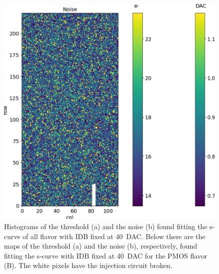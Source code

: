 \begin{figure}[h!]
            \includegraphics[width=.49\linewidth]{figures/charaterization/noise_map.pdf}            
            \caption{Histograms of the threshold (a) and the noise (b) found fitting the s-curve of all flavor with IDB fixed at \SI{40}{DAC}. Below there are the maps of the threshold (a) and the noise (b), respectively, found fitting the s-curve with IDB fixed at \SI{40}{DAC} for the PMOS flavor (B). The white pixels have the injection circuit broken.}
            \label{fig:threshold_noise_hist}
        \end{figure}      

